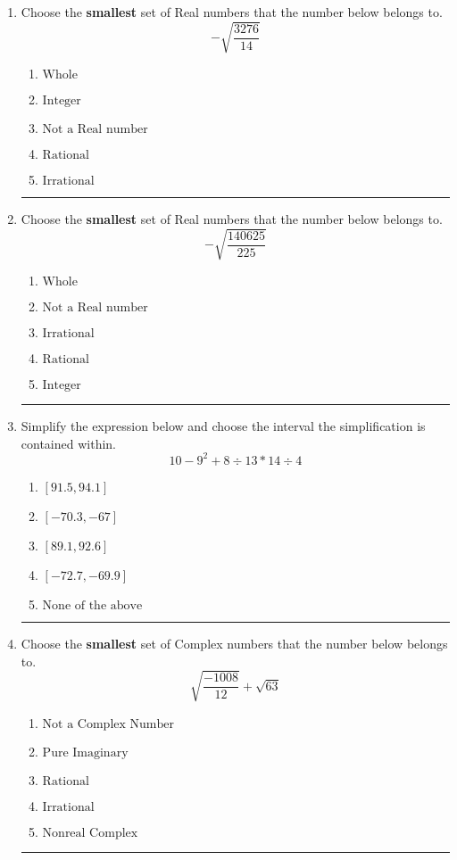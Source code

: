 \documentclass[14pt]{extbook}
\newcommand{\litem}[1]{\item#1\hspace*{-1cm}\rule{\textwidth}{0.4pt}}
\begin{document}
\begin{enumerate}
\litem{
Choose the \textbf{smallest} set of Real numbers that the number below belongs to.\[ -\sqrt{\frac{3276}{14}} \]\begin{enumerate}[label=\Alph*.]
\item \( \text{Whole} \)
\item \( \text{Integer} \)
\item \( \text{Not a Real number} \)
\item \( \text{Rational} \)
\item \( \text{Irrational} \)

\end{enumerate} }
\litem{
Choose the \textbf{smallest} set of Real numbers that the number below belongs to.\[ -\sqrt{\frac{140625}{225}} \]\begin{enumerate}[label=\Alph*.]
\item \( \text{Whole} \)
\item \( \text{Not a Real number} \)
\item \( \text{Irrational} \)
\item \( \text{Rational} \)
\item \( \text{Integer} \)

\end{enumerate} }
\litem{
Simplify the expression below and choose the interval the simplification is contained within.\[ 10 - 9^2 + 8 \div 13 * 14 \div 4 \]\begin{enumerate}[label=\Alph*.]
\item \( [91.5, 94.1] \)
\item \( [-70.3, -67] \)
\item \( [89.1, 92.6] \)
\item \( [-72.7, -69.9] \)
\item \( \text{None of the above} \)

\end{enumerate} }
\litem{
Choose the \textbf{smallest} set of Complex numbers that the number below belongs to.\[ \sqrt{\frac{-1008}{12}}+\sqrt{63} \]\begin{enumerate}[label=\Alph*.]
\item \( \text{Not a Complex Number} \)
\item \( \text{Pure Imaginary} \)
\item \( \text{Rational} \)
\item \( \text{Irrational} \)
\item \( \text{Nonreal Complex} \)


\end{enumerate}}
\end{enumerate}
\end{document}
